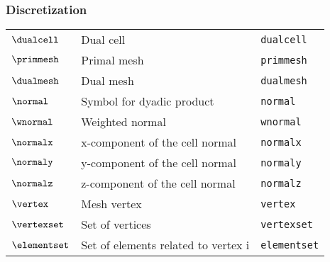 \subsubsection*{Discretization}
\begin{tabular}{l l l}
$\dualcell$ & Dual cell& \texttt{dualcell}\\
$\primmesh$ & Primal mesh& \texttt{primmesh}\\
$\dualmesh$ & Dual mesh& \texttt{dualmesh}\\
$\normal$ & Symbol for dyadic product& \texttt{normal}\\
$\wnormal$ & Weighted normal& \texttt{wnormal}\\
$\normalx$ & x-component of the cell normal& \texttt{normalx}\\
$\normaly$ & y-component of the cell normal& \texttt{normaly}\\
$\normalz$ & z-component of the cell normal& \texttt{normalz}\\
$\vertex$ & Mesh vertex& \texttt{vertex}\\
$\vertexset$ & Set of vertices& \texttt{vertexset}\\
$\elementset$ & Set of elements related to vertex i& \texttt{elementset}\\
\end{tabular}


